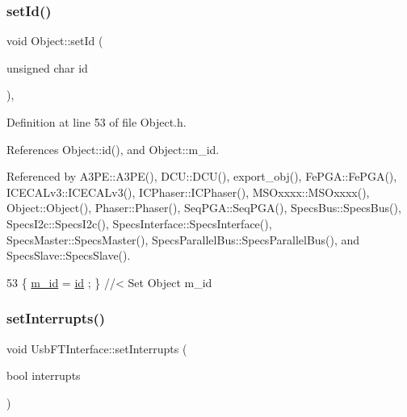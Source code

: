 \subsubsection{\texorpdfstring{set\+Id()}{setId()}}
{\footnotesize\ttfamily void Object\+::set\+Id (\begin{DoxyParamCaption}\item[{unsigned char}]{id }\end{DoxyParamCaption})\hspace{0.3cm}{\ttfamily [inline]}, {\ttfamily [inherited]}}



Definition at line 53 of file Object.\+h.



References Object\+::id(), and Object\+::m\+\_\+id.



Referenced by A3\+P\+E\+::\+A3\+P\+E(), D\+C\+U\+::\+D\+C\+U(), export\+\_\+obj(), Fe\+P\+G\+A\+::\+Fe\+P\+G\+A(), I\+C\+E\+C\+A\+Lv3\+::\+I\+C\+E\+C\+A\+Lv3(), I\+C\+Phaser\+::\+I\+C\+Phaser(), M\+S\+Oxxxx\+::\+M\+S\+Oxxxx(), Object\+::\+Object(), Phaser\+::\+Phaser(), Seq\+P\+G\+A\+::\+Seq\+P\+G\+A(), Specs\+Bus\+::\+Specs\+Bus(), Specs\+I2c\+::\+Specs\+I2c(), Specs\+Interface\+::\+Specs\+Interface(), Specs\+Master\+::\+Specs\+Master(), Specs\+Parallel\+Bus\+::\+Specs\+Parallel\+Bus(), and Specs\+Slave\+::\+Specs\+Slave().


\begin{DoxyCode}
53 \{ \hyperlink{classObject_aca74b9dbfed7b5556ea2d56c65b6b6b0}{m\_id}    = \hyperlink{classObject_af99145335cc61ff6e2798ea17db009d2}{id}    ; \} \textcolor{comment}{//< Set Object m\_id}
\end{DoxyCode}
\mbox{\label{classUsbFTInterface_a6fb31500f8a6adbd3d6f84f7932844da}} 
\subsubsection{\texorpdfstring{set\+Interrupts()}{setInterrupts()}}
{\footnotesize\ttfamily void Usb\+F\+T\+Interface\+::set\+Interrupts (\begin{DoxyParamCaption}\item[{bool}]{interrupts }\end{DoxyParamCaption})\hspace{0.3cm}{\ttfamily [inline]}}

